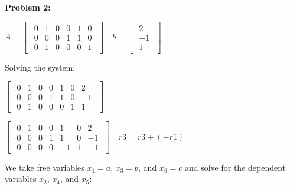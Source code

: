 \textbf{Problem 2:}

\singlespacing

\begin{math}
    A=\begin{bmatrix}
        \begin{array}{cccccc}
            0 & 1 & 0 & 0 & 1 & 0 \\
            0 & 0 & 0 & 1 & 1 & 0 \\
            0 & 1 & 0 & 0 & 0 & 1
        \end{array}
    \end{bmatrix}\quad
    b=\begin{bmatrix}
        \begin{array}{cccccc}
            2  \\
            -1 \\
            1
        \end{array}
    \end{bmatrix}
\end{math}

\singlespacing

Solving the system:

\singlespacing

\begin{math}
    \begin{bmatrix}
        \begin{array}{cccccc|c}
            0 & 1 & 0 & 0 & 1 & 0 & 2  \\
            0 & 0 & 0 & 1 & 1 & 0 & -1 \\
            0 & 1 & 0 & 0 & 0 & 1 & 1
        \end{array}
    \end{bmatrix}\quad
\end{math}

\singlespacing

\begin{math}
    \begin{bmatrix}
        \begin{array}{cccccc|c}
            0 & 1 & 0 & 0 & 1  & 0 & 2  \\
            0 & 0 & 0 & 1 & 1  & 0 & -1 \\
            0 & 0 & 0 & 0 & -1 & 1 & -1
        \end{array}
    \end{bmatrix}\quad
    r3 = r3  + (-r1)
\end{math}

\singlespacing

We take free variables $x_1 = a$, $x_3 = b$, and $x_6 = c$ and
solve for the dependent variables $x_2$, $x_4$, and $x_5$:

